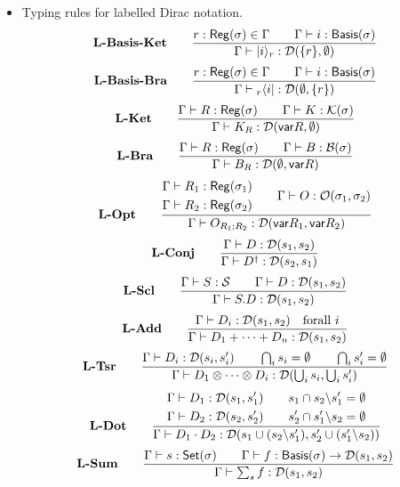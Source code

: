 \begin{itemize}
    \item Typing rules for labelled Dirac notation.
    \[
        \textbf{L-Basis-Ket}\qquad 
        \frac{r : \mathsf{Reg}(\sigma) \in \Gamma\qquad \Gamma \vdash i : \mathsf{Basis}(\sigma)}{\Gamma \vdash |i\rangle_r : \mathcal{D}(\{r\}, \emptyset)}
    \]
    \[
        \textbf{L-Basis-Bra}\qquad 
        \frac{r : \mathsf{Reg}(\sigma) \in \Gamma \qquad \Gamma \vdash i : \mathsf{Basis}(\sigma)}{\Gamma \vdash {}_r\langle i| : \mathcal{D}(\emptyset, \{r\})}
    \]
    \[
        \textbf{L-Ket}\qquad 
        \frac{\Gamma \vdash R : \mathsf{Reg}(\sigma)\qquad \Gamma \vdash K : \mathcal{K}(\sigma)}{\Gamma \vdash K_R : \mathcal{D}(\mathsf{var} R, \emptyset)}
    \]
    \[
        \textbf{L-Bra}\qquad 
        \frac{\Gamma \vdash R : \mathsf{Reg}(\sigma)\qquad \Gamma \vdash B : \mathcal{B}(\sigma)}{\Gamma \vdash B_R : \mathcal{D}(\emptyset, \mathsf{var} R)}
    \]
    \[
        \textbf{L-Opt}\qquad 
        \frac{
            \begin{aligned}
                \Gamma \vdash R_1 : \mathsf{Reg} (\sigma_1) \\
                \Gamma \vdash R_2 : \mathsf{Reg} (\sigma_2)
            \end{aligned}
            \qquad
            \Gamma \vdash O : \mathcal{O}(\sigma_1, \sigma_2)
        }
        {\Gamma \vdash O_{R_1;R_2} : \mathcal{D}(\mathsf{var} R_1, \mathsf{var} R_2)}
    \]
    \[
        \textbf{L-Conj}\qquad 
        \frac{\Gamma \vdash D : \mathcal{D}(s_1,s_2)}{\Gamma \vdash D^\dagger : \mathcal{D}(s_2,s_1)}
    \]
    \[
        \textbf{L-Scl}\qquad 
        \frac{\Gamma \vdash S : \mathcal{S}\qquad \Gamma \vdash D : \mathcal{D}(s_1,s_2)}{\Gamma \vdash S.D : \mathcal{D}(s_1,s_2)}
    \]
    \[
        \textbf{L-Add}\qquad
        \frac{\Gamma \vdash D_i : \mathcal{D}(s_1,s_2)\quad \text{forall } i}{\Gamma \vdash D_1+\cdots+D_n : \mathcal{D}(s_1,s_2)}
    \]
    \[
        \textbf{L-Tsr}\qquad
        \frac{
            \Gamma \vdash D_i : \mathcal{D}(s_i,s_i') \qquad
            \bigcap_i s_i = \emptyset \qquad
            \bigcap_i s_i' = \emptyset
        }
        {\Gamma \vdash D_1 \otimes \cdots \otimes D_i : \mathcal{D}(\bigcup_i s_i, \bigcup_i s_i')}
    \]
    \[
        \textbf{L-Dot}\qquad
        \frac{
            \begin{aligned}
                \Gamma \vdash D_1 : \mathcal{D}(s_1,s_1') \\
                \Gamma \vdash D_2 : \mathcal{D}(s_2,s_2')
            \end{aligned}
            \qquad 
            \begin{aligned}
                s_1 \cap s_2 \backslash s_1' = \emptyset \\
                s_2' \cap s_1' \backslash s_2 = \emptyset
            \end{aligned}
        }
        {\Gamma \vdash D_1\cdot D_2 : \mathcal{D}(s_1 \cup (s_2\backslash s_1'), s_2' \cup (s_1'\backslash s_2))}
    \]
    \[
        \textbf{L-Sum}\qquad
        \frac{\Gamma \vdash s : \mathsf{Set}(\sigma) \qquad \Gamma \vdash f : \mathsf{Basis}(\sigma) \to \mathcal{D}(s_1, s_2)}{\Gamma \vdash \sum_{s} f : \mathcal{D}(s_1, s_2)}
    \]

\end{itemize}

